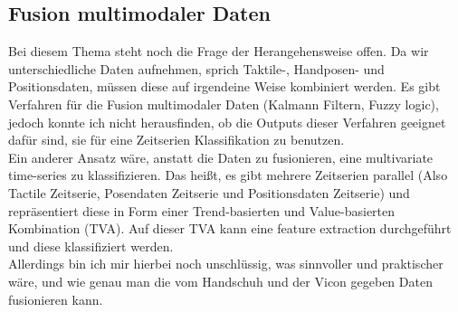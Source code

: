 \documentclass[]{report}
\begin{document}
\subsection*{Fusion multimodaler Daten}
Bei diesem Thema steht noch die Frage der Herangehensweise offen. Da wir unterschiedliche Daten aufnehmen, sprich Taktile-, Handposen- und Positionsdaten, müssen diese auf irgendeine Weise kombiniert werden. Es gibt Verfahren für die Fusion multimodaler Daten (Kalmann Filtern, Fuzzy logic), jedoch konnte ich nicht herausfinden, ob die Outputs dieser Verfahren geeignet dafür sind, sie für eine Zeitserien Klassifikation zu benutzen.\\
Ein anderer Ansatz wäre, anstatt die Daten zu fusionieren, eine multivariate time-series zu klassifizieren. Das heißt, es gibt mehrere Zeitserien parallel (Also Tactile Zeitserie, Posendaten Zeitserie und Positionsdaten Zeitserie) und repräsentiert diese in Form einer Trend-basierten und Value-basierten Kombination (TVA). Auf dieser TVA kann eine feature extraction durchgeführt und diese klassifiziert werden.\\
Allerdings bin ich mir hierbei noch unschlüssig, was sinnvoller und praktischer wäre, und wie genau man die vom Handschuh und der Vicon gegeben Daten fusionieren kann.
\end{document}
